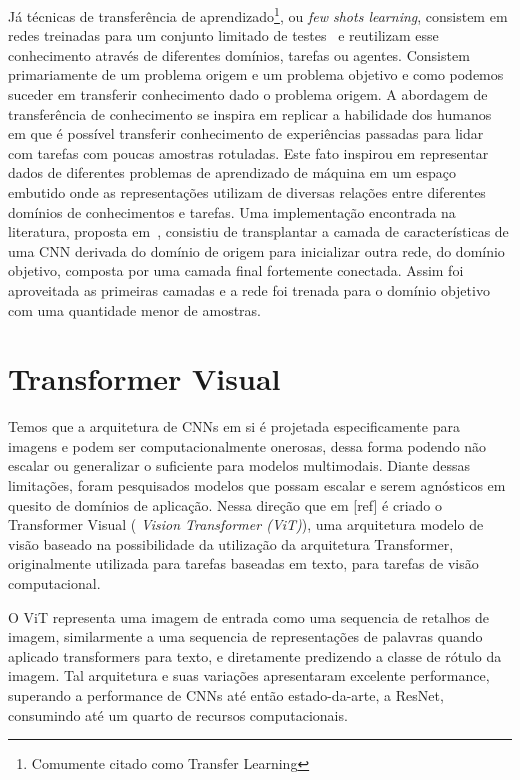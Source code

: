 Já técnicas de transferência de aprendizado\footnote{Comumente citado como Transfer Learning}, ou \textit{few shots learning}, consistem em redes treinadas para um conjunto limitado de testes~\cite{rostami2019learning}
e reutilizam esse conhecimento através de diferentes domínios, tarefas ou agentes. Consistem primariamente de um problema origem e um problema objetivo e como podemos suceder em transferir conhecimento dado o problema origem. A abordagem de transferência de conhecimento se inspira em replicar a habilidade dos humanos em que é possível transferir conhecimento de experiências passadas para lidar com tarefas com poucas amostras rotuladas. Este fato inspirou em representar dados de diferentes problemas de aprendizado de máquina em um espaço embutido onde as representações utilizam de diversas relações entre diferentes domínios de conhecimentos e tarefas. Uma implementação encontrada na literatura, proposta em~\cite{DBLP:journals/corr/abs-1811-04863}, consistiu de transplantar a camada de características de uma CNN derivada do domínio de origem para inicializar outra rede, do domínio objetivo, composta por uma camada final fortemente conectada. Assim foi aproveitada as primeiras camadas e a rede foi trenada para o domínio objetivo com uma quantidade menor de amostras.



\section{Transformer Visual}\label{sec:Cap2_transformer}


Temos que a arquitetura de CNNs em si é projetada especificamente para imagens e podem ser computacionalmente onerosas, dessa forma podendo não escalar ou generalizar o suficiente para modelos multimodais. Diante dessas limitações, foram pesquisados modelos que possam escalar e serem agnósticos em quesito de domínios de aplicação. Nessa direção que em [ref] é criado o Transformer Visual ( \textit{Vision Transformer (ViT)}), uma arquitetura modelo de visão baseado na possibilidade da utilização da arquitetura Transformer, originalmente utilizada para tarefas baseadas em texto, para tarefas de visão computacional.

O ViT representa uma imagem de entrada como uma sequencia de retalhos de imagem, similarmente a uma sequencia de representações de palavras quando aplicado transformers para texto, e diretamente predizendo a classe de rótulo da imagem. Tal arquitetura e suas variações apresentaram excelente performance, superando a performance de CNNs até então estado-da-arte, a ResNet, consumindo até um quarto de recursos computacionais.

